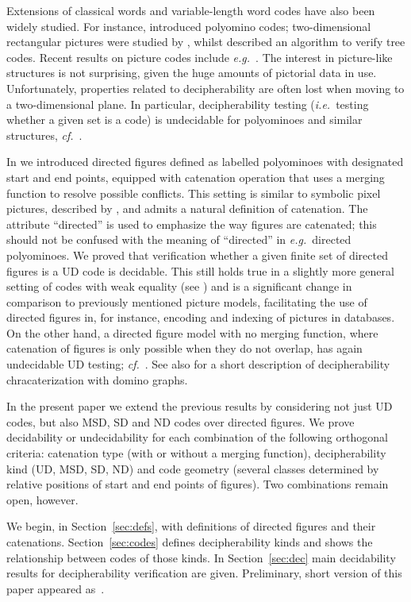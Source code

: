 \documentclass[final,nomarks]{dmtcs-episciences}
\begin{document}
Extensions of classical words and variable-length word codes
have also been widely studied. For instance, \cite{AigrBeauq}
introduced polyomino codes;
two-dimensional rectangular pictures were studied by 
\cite{GiamRest}, whilst \cite{MantRest}
described an algorithm to verify tree codes.
Recent results on picture codes include \textit{e.g.}\ \cite{AGM1,AGM2}.
The interest in picture-like structures is not surprising, given
the huge amounts of pictorial data in use. Unfortunately,
properties related to decipherability are often lost when moving
to a two-dimensional plane. In particular, decipherability
testing (\textit{i.e.}\ testing whether a given set is a code) is
undecidable for polyominoes and similar structures,
\textit{cf.}~\cite{Beauq,WMijcm}.

In \cite{KolMoc} we introduced directed figures defined as
labelled polyominoes with designated start and end points,
equipped with catenation operation that uses a merging function
to resolve possible conflicts. This setting is similar to
symbolic pixel pictures, described by \cite{CFG}, 
and admits a natural definition of
catenation. The attribute ``directed'' is used to emphasize the
way figures are catenated; this should not be confused with the
meaning of ``directed'' in \textit{e.g.}\ directed polyominoes.
We proved that verification whether a given finite set of
directed figures is a UD code is decidable. This still holds
true in a slightly more general setting of codes with weak
equality (see \cite{WMideal}) and is a significant change in
comparison to previously mentioned picture models, facilitating
the use of directed figures in, for instance, encoding and
indexing of pictures in databases. On the other hand, a directed
figure model with no merging function, where catenation of
figures is only possible when they do not overlap, has again
undecidable UD testing; \textit{cf.}~\cite{KolCOCOON,KolRAIRO}.
See also \cite{WMiwoca2013} for a short description of decipherability 
chracaterization with domino graphs.

In the present paper we extend the previous results by
considering not just UD codes, but also MSD, SD and ND codes
over directed figures. We prove decidability or undecidability
for each combination of the following orthogonal criteria:
catenation type (with or without a merging function),
decipherability kind (UD, MSD, SD, ND) and code geometry
(several classes determined by relative positions of start and
end points of figures). Two combinations remain open, however.

We begin, in Section~\ref{sec:defs}, with definitions of
directed figures and their catenations. Section~\ref{sec:codes}
defines decipherability kinds and shows the relationship between
codes of those kinds. In Section~\ref{sec:dec} main decidability
results for decipherability verification are given. Preliminary, short version
of this paper appeared as~\cite{KolMocIWOCA}.
\end{document}
